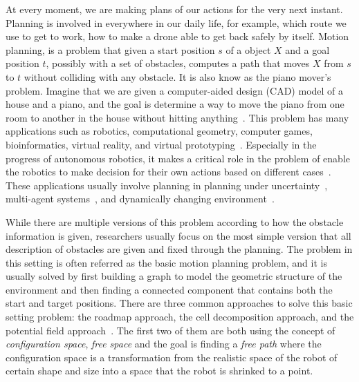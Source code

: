 
At every moment, we are making plans of our actions for the very next instant.
Planning is involved in everywhere in our daily life, for example, which route we use to get to work, how to make a drone able to get back safely by itself.
Motion planning, is a problem that given a start position \(s\) of a object \(X\) and a goal position \(t\), possibly with a set of obstacles, computes a path that moves \(X\) from \(s\) to \(t\) without colliding with any obstacle.
It is also know as the piano mover's problem.
Imagine that we are given a computer-aided design (CAD) model of a house and a piano, and the goal is determine a way to move the piano from one room to another in the house without hitting anything~\cite{lavalle2006planning}.
This problem has many applications such as robotics, computational geometry, computer games, bioinformatics, virtual reality, and virtual prototyping~\cite{latombe2012robot}. Especially in the progress of autonomous robotics, it makes a critical role in the problem of enable the robotics to make decision for their own actions based on different cases~\cite{eric98}. These applications usually involve planning in planning under uncertainty~\cite{kaelbling2013integrated}, multi-agent systems~\cite{bourgault2002information}, and dynamically changing environment~\cite{van2005creating}.

While there are multiple versions of this problem according to how the obstacle information is given, researchers usually focus on the most simple version that all description of obstacles are given and fixed through the planning.
The problem in this setting is often referred as the basic motion planning problem, and it is usually solved by first building a graph to model the geometric structure of the environment and then finding a connected component that contains both the start and target positions. There are three common approaches to solve this basic setting problem: the roadmap approach, the cell decomposition approach, and the potential field approach~\cite{eric98}. The first two of them are both using the concept of \textit{configuration space}, \textit{free space} and the goal is finding a \textit{free path} where the configuration space is a transformation from the realistic space of the robot of certain shape and size into a space that the robot is shrinked to a point.

